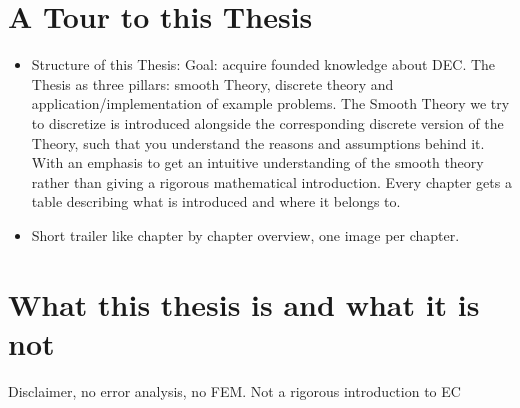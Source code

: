 	\section{A Tour to this Thesis}
		\begin{itemize}
		\item	Structure of this Thesis: Goal: acquire founded knowledge about DEC. The Thesis as three pillars: smooth Theory, discrete theory and application/implementation of example problems. The Smooth Theory we try to discretize is introduced alongside the corresponding discrete version of the Theory, such that you understand  the reasons and assumptions behind it. With an emphasis to get an intuitive understanding of the smooth theory rather than giving a rigorous mathematical introduction. Every chapter gets a table describing what is introduced and where it belongs to.
		
		\item Short trailer like chapter by chapter overview, one image per chapter.
		\end{itemize}
		
	\section{What this thesis is and what it is not}
		Disclaimer, no error analysis, no FEM. Not a rigorous introduction to EC
	